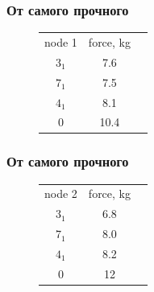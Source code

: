\documentclass{beamer}
\begin{document}
\begin{frame}
\frametitle{От самого прочного}

\begin{figure}%
    \centering
    \qquad
    \begin{tabular}{ c c c }
    node 1 & force, kg \\
    $3_1$ & 7.6 \\
    $7_1$ & 7.5 \\
    $4_1$ & 8.1 \\
    $0$ & 10.4 \\
    \end{tabular}
\end{figure}

\end{frame}

\begin{frame}
\frametitle{От самого прочного}

\begin{figure}%
    \centering
    \qquad
    \begin{tabular}{ c c c }
    node 2 & force, kg \\
    $3_1$ & 6.8 \\
    $7_1$ & 8.0 \\
    $4_1$ & 8.2 \\
    $0$ & 12 \\
    \end{tabular}
\end{figure}

\end{frame}
\end{document}

